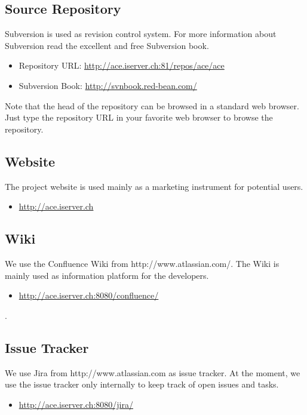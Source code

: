 \documentclass[11pt,a4paper]{article}
\begin{document}
\subsection{Source Repository}
Subversion is used as revision control system. For more information about 
Subversion read the excellent and free Subversion book. 
\begin{itemize}
 \item Repository URL: \href{http://ace.iserver.ch:81/repos/ace/ace}{http://ace.iserver.ch:81/repos/ace/ace}
 \item Subversion Book: \href{http://svnbook.red-bean.com/}{http://svnbook.red-bean.com/}
\end{itemize}
Note that the head of the repository can be browsed in a standard web browser. 
Just type the repository URL in your favorite web browser to browse the 
repository.

\subsection{Website}
The project website is used mainly as a marketing instrument for potential users. 
\begin{itemize}
 \item \href{http://ace.iserver.ch}{http://ace.iserver.ch}
\end{itemize}

\subsection{Wiki}
We use the Confluence Wiki from http://www.atlassian.com/. The Wiki is mainly 
used as information platform for the developers.
\begin{itemize}
 \item \href{http://ace.iserver.ch:8080/confluence/}{http://ace.iserver.ch:8080/confluence/}
\end{itemize}. 

\subsection{Issue Tracker}
We use Jira from http://www.atlassian.com as issue tracker. At the moment, we 
use the issue tracker only internally to keep track of open issues and tasks.
\begin{itemize}
 \item \href{http://ace.iserver.ch:8080/jira/}{http://ace.iserver.ch:8080/jira/}
\end{itemize}
\end{document}
